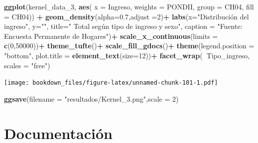 \documentclass[]{book}
\newenvironment{Shaded}{\begin{snugshade}}{\end{snugshade}}
\newcommand{\DataTypeTok}[1]{\textcolor[rgb]{0.13,0.29,0.53}{#1}}
\newcommand{\DecValTok}[1]{\textcolor[rgb]{0.00,0.00,0.81}{#1}}
\newcommand{\FloatTok}[1]{\textcolor[rgb]{0.00,0.00,0.81}{#1}}
\newcommand{\KeywordTok}[1]{\textcolor[rgb]{0.13,0.29,0.53}{\textbf{#1}}}
\newcommand{\NormalTok}[1]{#1}
\newcommand{\OperatorTok}[1]{\textcolor[rgb]{0.81,0.36,0.00}{\textbf{#1}}}
\newcommand{\StringTok}[1]{\textcolor[rgb]{0.31,0.60,0.02}{#1}}
\begin{document}
\begin{Shaded}
\begin{Highlighting}[]
\KeywordTok{ggplot}\NormalTok{(kernel_data_}\DecValTok{3}\NormalTok{, }\KeywordTok{aes}\NormalTok{(}
  \DataTypeTok{x =}\NormalTok{ Ingreso,}
  \DataTypeTok{weights =}\NormalTok{ PONDII,}
  \DataTypeTok{group =}\NormalTok{ CH04,}
  \DataTypeTok{fill =}\NormalTok{ CH04)) }\OperatorTok{+}
\StringTok{  }\KeywordTok{geom_density}\NormalTok{(}\DataTypeTok{alpha=}\FloatTok{0.7}\NormalTok{,}\DataTypeTok{adjust =}\DecValTok{2}\NormalTok{)}\OperatorTok{+}
\StringTok{  }\KeywordTok{labs}\NormalTok{(}\DataTypeTok{x=}\StringTok{"Distribución del ingreso"}\NormalTok{, }\DataTypeTok{y=}\StringTok{""}\NormalTok{,}
       \DataTypeTok{title=}\StringTok{" Total según tipo de ingreso y sexo"}\NormalTok{, }
       \DataTypeTok{caption =} \StringTok{"Fuente: Encuesta Permanente de Hogares"}\NormalTok{)}\OperatorTok{+}
\StringTok{  }\KeywordTok{scale_x_continuous}\NormalTok{(}\DataTypeTok{limits =} \KeywordTok{c}\NormalTok{(}\DecValTok{0}\NormalTok{,}\DecValTok{50000}\NormalTok{))}\OperatorTok{+}
\StringTok{  }\KeywordTok{theme_tufte}\NormalTok{()}\OperatorTok{+}
\StringTok{  }\KeywordTok{scale_fill_gdocs}\NormalTok{()}\OperatorTok{+}
\StringTok{  }\KeywordTok{theme}\NormalTok{(}\DataTypeTok{legend.position =} \StringTok{"bottom"}\NormalTok{,}
        \DataTypeTok{plot.title      =} \KeywordTok{element_text}\NormalTok{(}\DataTypeTok{size=}\DecValTok{12}\NormalTok{))}\OperatorTok{+}
\StringTok{  }\KeywordTok{facet_wrap}\NormalTok{(}\OperatorTok{~}\NormalTok{Tipo_ingreso, }\DataTypeTok{scales =} \StringTok{"free"}\NormalTok{)}
\end{Highlighting}
\end{Shaded}

\texttt{[image: bookdown\_files/figure-latex/unnamed-chunk-101-1.pdf]}

\begin{Shaded}
\begin{Highlighting}[]
\KeywordTok{ggsave}\NormalTok{(}\DataTypeTok{filename =} \StringTok{"resultados/Kernel_3.png"}\NormalTok{,}\DataTypeTok{scale =} \DecValTok{2}\NormalTok{)}
\end{Highlighting}
\end{Shaded}

\hypertarget{documentacion}{%
\chapter{Documentación}\label{documentacion}}
\end{document}
